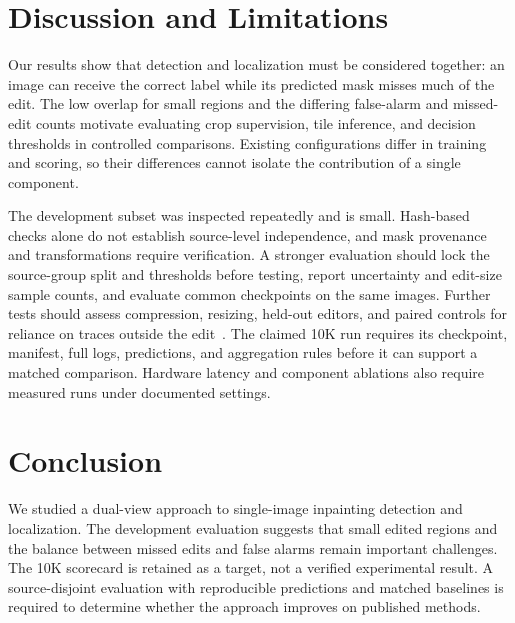 




\section{Discussion and Limitations}
Our results show that detection and localization must be considered together: an image can receive the correct label while its predicted mask misses much of the edit. The low overlap for small regions and the differing false-alarm and missed-edit counts motivate evaluating crop supervision, tile inference, and decision thresholds in controlled comparisons. Existing configurations differ in training and scoring, so their differences cannot isolate the contribution of a single component.

The development subset was inspected repeatedly and is small. Hash-based checks alone do not establish source-level independence, and mask provenance and transformations require verification. A stronger evaluation should lock the source-group split and thresholds before testing, report uncertainty and edit-size sample counts, and evaluate common checkpoints on the same images. Further tests should assess compression, resizing, held-out editors, and paired controls for reliance on traces outside the edit~\cite{inpx}. The claimed 10K run requires its checkpoint, manifest, full logs, predictions, and aggregation rules before it can support a matched comparison. Hardware latency and component ablations also require measured runs under documented settings.

\section{Conclusion}
We studied a dual-view approach to single-image inpainting detection and localization. The development evaluation suggests that small edited regions and the balance between missed edits and false alarms remain important challenges. The 10K scorecard is retained as a target, not a verified experimental result. A source-disjoint evaluation with reproducible predictions and matched baselines is required to determine whether the approach improves on published methods.
